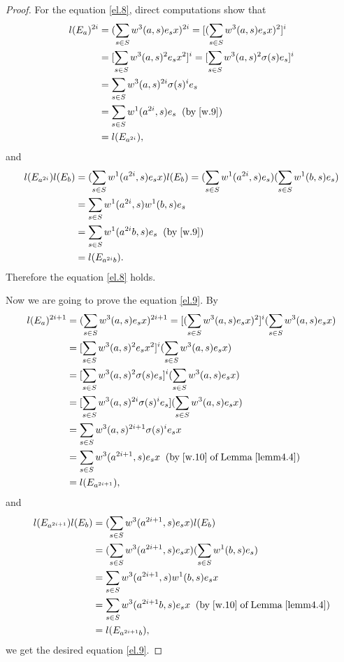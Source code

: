 \documentclass[a4paper,11pt]{amsart}
\numberwithin{equation}{section}
\begin{document}
\begin{proof}
For the equation \eqref{el.8}, direct computations show that
\begin{align*}
l(E_a)^{2i}&=(\sum\limits_{s \in S}w^3(a,s)e_s x)^{2i}=[(\sum\limits_{s \in S}w^3(a,s)e_s x)^2]^{i}\\
&=[\sum\limits_{s \in S}w^3(a,s)^2 e_s x^2]^{i}=[\sum\limits_{s \in S}w^3(a,s)^2 \sigma(s) e_s]^{i}\\
&=\sum\limits_{s \in S}w^3(a,s)^{2i} \sigma(s)^i e_s\\
&=\sum\limits_{s \in S}w^1(a^{2i},s)e_s \;\;(\text{by}\;\eqref{w.9})\\
&=l(E_{a^{2i}}),
\end{align*}
and
\begin{align*}
l(E_{a^{2i}})l(E_b)&=(\sum\limits_{s \in S}w^1(a^{2i},s)e_s x) l(E_b)=(\sum\limits_{s \in S}w^1(a^{2i},s)e_s) (\sum\limits_{s \in S}w^1(b,s)e_s)\\
&=\sum\limits_{s \in S}w^1(a^{2i},s) w^1(b,s)e_s\\
&=\sum\limits_{s \in S}w^1(a^{2i}b,s)e_s \;\;(\text{by}\;\eqref{w.9})\\
&=l(E_{a^{2i}b}).
\end{align*}
Therefore the equation \eqref{el.8} holds.

Now we are going to prove the equation \eqref{el.9}. By
\begin{align*}
l(E_a)^{2i+1}&=(\sum\limits_{s \in S}w^3(a,s)e_s x)^{2i+1}=[(\sum\limits_{s \in S}w^3(a,s)e_s x)^2]^{i} (\sum\limits_{s \in S}w^3(a,s)e_s x)\\
&=[\sum\limits_{s \in S}w^3(a,s)^2 e_s x^2]^{i} (\sum\limits_{s \in S}w^3(a,s)e_s x)\\
&=[\sum\limits_{s \in S}w^3(a,s)^{2}\sigma(s) e_s]^{i} (\sum\limits_{s \in S}w^3(a,s)e_s x)\\
&=[\sum\limits_{s \in S}w^3(a,s)^{2i}\sigma(s)^i e_s] (\sum\limits_{s \in S}w^3(a,s)e_s x)\\
&=\sum\limits_{s \in S}w^3(a,s)^{2i+1}\sigma(s)^i e_s x\\
&=\sum\limits_{s \in S}w^3(a^{2i+1},s) e_s x  \;\;(\text{by}\;\eqref{w.10}\; \text{of}\; \text{Lemma}\; \ref{lemm4.4})\\
&=l(E_{a^{2i+1}}),
\end{align*}
and
\begin{align*}
l(E_{a^{2i+1}})l(E_b)&=(\sum\limits_{s \in S}w^3(a^{2i+1},s)e_s x) l(E_b)\\
&=(\sum\limits_{s \in S}w^3(a^{2i+1},s)e_s x) (\sum\limits_{s \in S}w^1(b,s)e_s)\\
&=\sum\limits_{s \in S}w^3(a^{2i+1},s) w^1(b,s)e_s x\\
&=\sum\limits_{s \in S}w^3(a^{2i+1}b,s)e_s x \;\;(\text{by}\;\eqref{w.10}\; \text{of}\; \text{Lemma}\; \ref{lemm4.4})\\
&=l(E_{a^{2i+1}b}),
\end{align*}
we get the desired equation \eqref{el.9}.


\end{proof}
\end{document}
